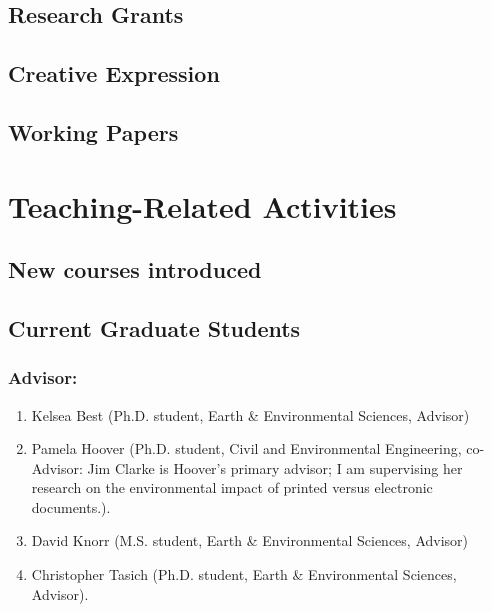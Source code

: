 \documentclass[10pt]{article}
\begin{document}
	\subsection{Research Grants}
	
	\subsection{Creative Expression}
	
%
\iftrue
	\subsection{Working Papers} %
	
\fi

\section{Teaching-Related Activities}
	\subsection{New courses introduced}
	
	\subsection{Current Graduate Students}
    \subsubsection{Advisor:}
	\begin{enumerate}
    \item Kelsea Best (Ph.D. student, Earth \& Environmental Sciences, Advisor)
    \item Pamela Hoover (Ph.D. student, Civil and Environmental Engineering, co-Advisor: Jim Clarke is Hoover's primary advisor; I am supervising her research on the environmental impact of printed versus electronic documents.).
    \item David Knorr (M.S. student, Earth \& Environmental Sciences, Advisor)
    \item Christopher Tasich (Ph.D. student, Earth \& Environmental Sciences, Advisor).
    \end{enumerate}
\end{document}
